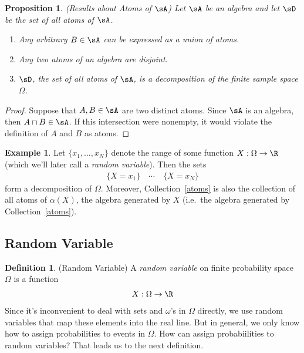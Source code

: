 \documentclass[12pt]{article}
\theoremstyle{plain}
\newtheorem{prop}[thm]{Proposition}
\theoremstyle{definition}
\newtheorem{defn}[thm]{Definition}
\newtheorem{ex}[thm]{Example}
\theoremstyle{remark}
\newcommand{\ra}{\rightarrow}
\begin{document}
\begin{prop}\emph{(Results about Atoms of $\sA$)}
Let $\sA$ be an algebra and let $\sD$ be the set of all atoms of $\sA$.
\begin{enumerate}
  \item Any arbitrary $B\in\sA$ can be expressed as a union of atoms.
  \item Any two atoms of an algebra are disjoint.
  \item $\sD$, the set of all atoms of $\sA$, is a decomposition of the
    finite sample space $\Omega$.
\end{enumerate}
\end{prop}
\begin{proof}
Suppose that $A,B\in\sA$ are two distinct atoms. Since $\sA$ is an
algebra, then $A\cap B\in\sA$. If this intersection were nonempty, it
would violate the definition of $A$ and $B$ as atoms.
\end{proof}

\begin{ex}
Let $\{x_1,\ldots,x_N\}$ denote the range of some function
$X:\Omega\ra\R$ (which we'll later call a \emph{random variable}). Then
the sets
\begin{align}
  \{X=x_1\}\quad\cdots\quad\{X=x_N\}
  \label{atoms}
\end{align}
form a decomposition of $\Omega$. Moreover, Collection~\ref{atoms}
is also the collection of all atoms of $\alpha(X)$, the algebra
generated by $X$ (i.e.\ the algebra generated by Collection~\ref{atoms}).
\end{ex}

\clearpage
\subsection{Random Variable}

\begin{defn}{(Random Variable)}
A \emph{random variable} on finite probability space $\Omega$ is a
function
\begin{align*}
  X: \Omega\ra \R
\end{align*}
Since it's inconvenient to deal with sets and $\omega$'s in $\Omega$
directly, we use random variables that map these elements into the real
line. But in general, we only know how to assign probabilities to
events in $\Omega$. How can assign probabiilities to random variables?
That leads us to the next definition.
\end{defn}
\end{document}
